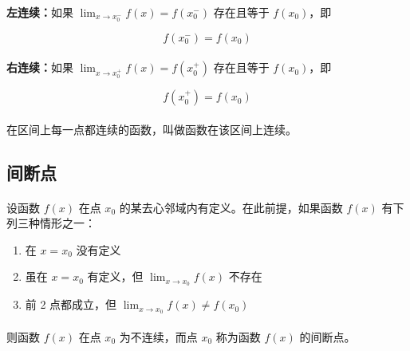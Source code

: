 \paragraph{}
\textbf{左连续：}如果 $\lim_{x \to x_0^-} f(x) = f(x_0^-)$ 存在且等于 $f(x_0)$，即

\begin{equation}
f(x_0^-) = f(x_0)
\end{equation}

\paragraph{}
\textbf{右连续：}如果 $\lim_{x \to x_0^+}f(x) = f(x_0^+)$ 存在且等于 $f(x_0)$，即

\begin{equation}
f(x_0^+) = f(x_0)
\end{equation}

\paragraph{}
在区间上每一点都连续的函数，叫做函数在该区间上连续。

\subsection{间断点}
\paragraph{}
设函数 $f(x)$ 在点 $x_0$ 的某去心邻域内有定义。在此前提，如果函数 $f(x)$ 有下列三种情形之一：

\begin{enumerate}
  \item 在 $x = x_0$ 没有定义
  \item 虽在 $x = x_0$ 有定义，但 $\lim_{x \to x_0}f(x)$ 不存在
  \item 前 2 点都成立，但 $\lim_{x \to x_0}f(x) \neq f(x_0)$
\end{enumerate}

\paragraph{}
则函数 $f(x)$ 在点 $x_0$ 为不连续，而点 $x_0$ 称为函数 $f(x)$ 的间断点。
